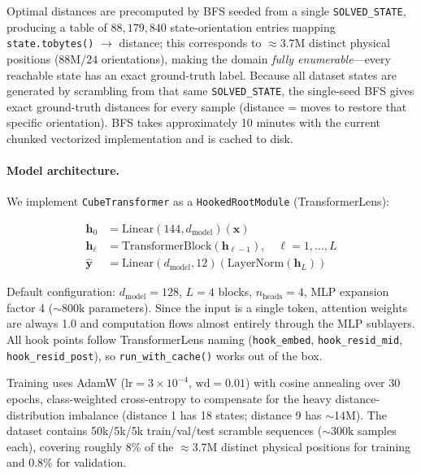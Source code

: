 \documentclass[12pt]{article}
\begin{document}
Optimal distances are precomputed by BFS seeded from a single
\texttt{SOLVED\_STATE}, producing a table of $88{,}179{,}840$ state-orientation
entries mapping \texttt{state.tobytes()} $\to$ distance; this corresponds to
${\approx}3.7\text{M}$ distinct physical positions ($88\text{M} / 24$
orientations), making the domain \emph{fully enumerable}---every reachable
state has an exact ground-truth label.  Because all dataset states are generated
by scrambling from that same \texttt{SOLVED\_STATE}, the single-seed BFS gives
exact ground-truth distances for every sample (distance = moves to restore that
specific orientation).  BFS takes approximately 10 minutes with the current chunked vectorized
implementation and is cached to disk.

\paragraph{Model architecture.}

We implement \texttt{CubeTransformer} as a \texttt{HookedRootModule} (TransformerLens):

\begin{align*}
\mathbf{h}_0 &= \text{Linear}(144, d_\text{model})(\mathbf{x}) \\
\mathbf{h}_\ell &= \text{TransformerBlock}(\mathbf{h}_{\ell-1}), \quad \ell = 1,\ldots,L \\
\hat{\mathbf{y}} &= \text{Linear}(d_\text{model}, 12)(\text{LayerNorm}(\mathbf{h}_L))
\end{align*}

Default configuration: $d_\text{model}{=}128$, $L{=}4$ blocks, $n_\text{heads}{=}4$,
MLP expansion factor 4 (${\sim}800\text{k}$ parameters).  Since the input is a
single token, attention weights are always 1.0 and computation flows almost
entirely through the MLP sublayers.  All hook points follow TransformerLens
naming (\texttt{hook\_embed}, \texttt{hook\_resid\_mid},
\texttt{hook\_resid\_post}), so \texttt{run\_with\_cache()} works out of the box.

Training uses AdamW ($\text{lr}{=}3{\times}10^{-4}$, $\text{wd}{=}0.01$) with
cosine annealing over 30 epochs, class-weighted cross-entropy to compensate for
the heavy distance-distribution imbalance (distance 1 has 18 states; distance 9
has $\sim$14M).  The dataset contains 50k/5k/5k train/val/test scramble
sequences (${\sim}300\text{k}$ samples each), covering roughly 8\% of the
${\approx}3.7\text{M}$ distinct physical positions for training and 0.8\% for
validation.
\end{document}
